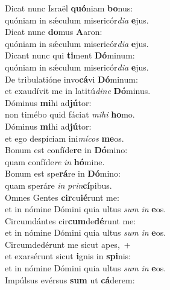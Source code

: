 \evenverse Dicat nunc Israël \textbf{quó}niam \textbf{bo}nus:~\*\\
\evenverse quóniam in sǽculum misericór\textit{di}\textit{a} \textbf{e}jus.\\
\oddverse Dicat nunc \textbf{do}mus \textbf{A}aron:~\*\\
\oddverse quóniam in sǽculum misericór\textit{di}\textit{a} \textbf{e}jus.\\
\evenverse Dicant nunc qui \textbf{ti}ment \textbf{Dó}minum:~\*\\
\evenverse quóniam in sǽculum misericór\textit{di}\textit{a} \textbf{e}jus.\\
\oddverse De tribulatióne invo\textbf{cá}vi \textbf{Dó}minum:~\*\\
\oddverse et exaudívit me in latitú\textit{di}\textit{ne} \textbf{Dó}minus.\\
\evenverse Dóminus \textbf{mi}hi ad\textbf{jú}tor:~\*\\
\evenverse non timébo quid fáciat \textit{mi}\textit{hi} \textbf{ho}mo.\\
\oddverse Dóminus \textbf{mi}hi ad\textbf{jú}tor:~\*\\
\oddverse et ego despíciam ini\textit{mí}\textit{cos} \textbf{me}os.\\
\evenverse Bonum est confíde\textbf{re} in \textbf{Dó}mino:~\*\\
\evenverse quam confíde\textit{re} \textit{in} \textbf{hó}mine.\\
\oddverse Bonum est spe\textbf{rá}re in \textbf{Dó}mino:~\*\\
\oddverse quam speráre \textit{in} \textit{prin}\textbf{cí}pibus.\\
\evenverse Omnes Gentes \textbf{cir}cu\textbf{ié}runt me:~\*\\
\evenverse et in nómine Dómini quia ultus \textit{sum} \textit{in} \textbf{e}os.\\
\oddverse Circumdántes cir\textbf{cum}de\textbf{dé}runt me:~\*\\
\oddverse et in nómine Dómini quia ultus \textit{sum} \textit{in} \textbf{e}os.\\
\evenverse Circumdedérunt me sicut apes,~+\\
\evenverse  et exarsérunt sicut \textbf{i}gnis in \textbf{spi}nis:~\*\\
\evenverse et in nómine Dómini quia ultus \textit{sum} \textit{in} \textbf{e}os.\\
\oddverse Impúlsus evérsus \textbf{sum} ut \textbf{cá}derem:~\*\\
